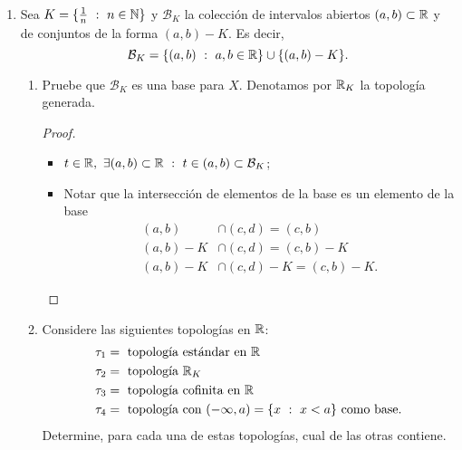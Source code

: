 \begin{enumerate}
\begin{enumerate}
		\item Determine cuando
		\[
		\tau_3 = \{ U \subset X \ : \ U = X \text{ o } X \setminus U \text{ es infinito} \}
		\]
		es una topología en $X$.
		\begin{proof}~
			Si $p \in X \implies \{ p \}^c$ es infinito $\implies \{ p \}$ es abierto. Si $\tau_3$ es topología y $q \in X$, entonces
			\[
			\bigcup_{p \neq q} \{ p \} = X \setminus \{ q \} \implies (X \setminus \{ q \})^c = \{ q \}
			\]
			es infinito. Contradicción! \textreferencemark \ Es decir, $\tau_3$ no es topología.
		\end{proof}
	\end{enumerate}

	\item Sea $K = \{ \frac{1}{n} \ : \ n \in \mathbb{N} \}$ y $\mathcal{B}_K$ la colección de intervalos abiertos $(a,b) \subset \mathbb{R}$ y de conjuntos de la forma $(a,b) - K$. Es decir,
	\[
	\mathcal{B}_K = \{ (a,b) \ : \ a,b \in \R \} \cup \{ (a,b)-K \}.
	\]
	\begin{enumerate}
		\item Pruebe que $\mathcal{B}_K$ es una base para $X$. Denotamos por $\mathbb{R}_K$ la topología generada.
		\begin{proof}~
			\begin{itemize}
				\item $t \in \R,\ \exists (a,b) \subset \R \ : \ t \in (a,b) \subset \mathcal{B}_K$;

				\item Notar que la intersección de elementos de la base es un elemento de la base
				\begin{align*}
					(a,b) & \cap (c,d)  = (c,b) \\
					(a,b)-K & \cap (c,d)  = (c,b)-K \\
					(a,b)-K & \cap (c,d)-K  = (c,b)-K
				.\end{align*}
			\end{itemize}
		\end{proof}

		\item Considere las siguientes topologías en $\mathbb{R}$:
		\begin{align*}
			\tau_1 & = \text{ topología estándar en } \R \\
			\tau_2 & = \text{ topología } \R_K \\
			\tau_3 & = \text{ topología cofinita en } \R \\
			\tau_4 & = \text{ topología con } (-\infty, a) = \{ x \ : \ x < a \} \text{ como base}  
		.\end{align*}
		Determine, para cada una de estas topologías, cual de las otras contiene.
	\end{enumerate}


\end{enumerate}
